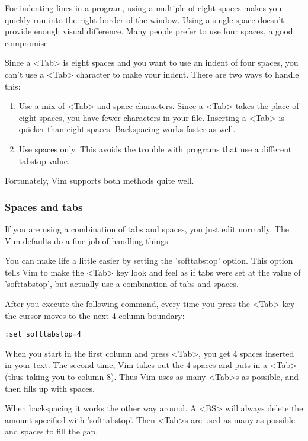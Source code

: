 For indenting lines in a program, using a multiple of eight spaces makes you quickly run into the right border of the window.
Using a single space doesn't provide enough visual difference.
Many people prefer to use four spaces, a good compromise.

Since a <Tab> is eight spaces and you want to use an indent of four spaces, you can't use a <Tab> character to make your indent.
There are two ways to handle this:

\begin{enumerate}
				\item Use a mix of <Tab> and space characters.
								Since a <Tab> takes the place of eight spaces, you have fewer characters in your file.
								Inserting a <Tab> is quicker than eight spaces.
								Backspacing works faster as well.
				\item Use spaces only.
								This avoids the trouble with programs that use a different tabstop value.
\end{enumerate}

Fortunately, Vim supports both methods quite well.
\subsubsection{Spaces and tabs}
If you are using a combination of tabs and spaces, you just edit normally.
The Vim defaults do a fine job of handling things.

You can make life a little easier by setting the 'softtabstop' option.
This option tells Vim to make the <Tab> key look and feel as if tabs were set at the value of 'softtabstop', but actually use a combination of tabs and spaces.

After you execute the following command, every time you press the <Tab> key the cursor moves to the next 4-column boundary:

\begin{Verbatim}[samepage=true]
 :set softtabstop=4
\end{Verbatim}

When you start in the first column and press <Tab>, you get 4 spaces inserted in your text.
The second time, Vim takes out the 4 spaces and puts in a <Tab> (thus taking you to column 8).
Thus Vim uses as many <Tab>s as possible, and then fills up with spaces.

When backspacing it works the other way around.
A <BS> will always delete the amount specified with 'softtabstop'.
Then <Tab>s are used as many as possible and spaces to fill the gap.

